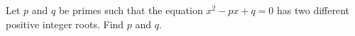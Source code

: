Let $p$ and $q$ be primes such that the equation $x^2-px+q=0$ has two different positive integer roots. Find $p$ and $q$.
